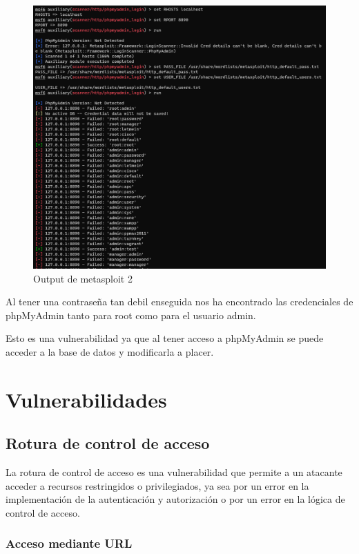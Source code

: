 \documentclass{report}
\begin{document}
            \begin{figure}[H]
                \centering
                \includegraphics[width=\textwidth]{./img/audit1/msf2.png}
                \caption{Output de metasploit 2}
            \end{figure}
            Al tener una contraseña tan debil enseguida nos ha encontrado las credenciales de phpMyAdmin tanto para root como para el usuario admin.
            
            Esto es una vulnerabilidad ya que al tener acceso a phpMyAdmin se puede acceder a la base de datos y modificarla a placer.
        \clearpage
    \chapter{Vulnerabilidades}
        \section{Rotura de control de acceso}
            La rotura de control de acceso es una vulnerabilidad que permite a un atacante acceder a recursos restringidos o privilegiados, ya sea por un error en la implementación de la autenticación y autorización o por un error en la lógica de control de acceso.
            \subsection{Acceso mediante URL}
\end{document}
